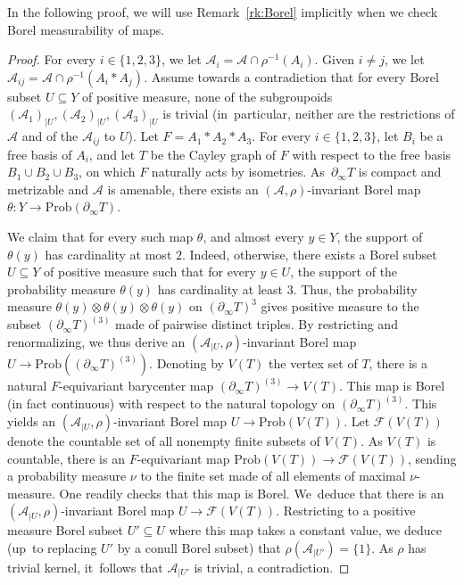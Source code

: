 \documentclass[11pt]{article}
\numberwithin{equation}{section}
\let\mathcal\mathscr
\theoremstyle{plain}
\theoremstyle{definition}
\newcommand{\cala}{\mathcal{A}}
\newcommand{\calf}{\mathcal{F}}
\newcommand{\Prob}{\mathrm{Prob}}
\begin{document}
In the following proof, we will use Remark~\ref{rk:Borel} implicitly when we check Borel measurability of maps.

\begin{proof}
For every $i\in\{1,2,3\}$, we let $\cala_i=\cala\cap\rho^{-1}(A_i)$. Given $i\neq j$, we let $\cala_{ij}=\cala\cap\rho^{-1}(A_i\ast A_j)$. Assume towards a contradiction that for every Borel subset $U\subseteq Y$ of positive measure, none of the subgroupoids $(\cala_1)_{|U},(\cala_2)_{|U},(\cala_3)_{|U}$ is trivial (in~par\-ticular, neither are the restrictions of $\cala$ and of the $\cala_{ij}$ to $U$). Let $F=A_1\ast A_2\ast A_3$. For every $i\in\{1,2,3\}$, let $B_i$ be a free basis of $A_i$, and let $T$ be the Cayley graph of $F$ with respect to the free basis $B_1\cup B_2\cup B_3$, on which $F$ naturally acts by isometries. As~$\partial_\infty T$ is compact and metrizable and $\cala$ is amenable, there exists an $(\cala,\rho)$-invariant Borel map $\theta:Y\to \Prob(\partial_\infty T)$.

We claim that for every such map $\theta$, and almost every $y\in Y$, the support of $\theta(y)$ has cardinality at most $2$. Indeed, otherwise, there exists a Borel subset $U\subseteq Y$ of positive measure such that for every $y\in U$, the support of the probability measure $\theta(y)$ has cardinality at least $3$. Thus, the probability measure $\theta(y)\otimes\theta(y)\otimes\theta(y)$ on $(\partial_\infty T)^3$ gives positive measure to the subset $(\partial_\infty T)^{(3)}$ made of pairwise distinct triples. By restricting and renormalizing, we thus derive an $(\cala_{|U},\rho)$-invariant Borel map $U\to\Prob((\partial_\infty T)^{(3)})$. Denoting by $V(T)$ the vertex set of $T$, there is a natural $F$-equivariant barycenter map $(\partial_\infty T)^{(3)}\to V(T)$. This map is Borel (in fact continuous) with respect to the natural topology on $(\partial_\infty T)^{(3)}$. This yields an $(\cala_{|U},\rho)$-invariant Borel map $U\to\Prob(V(T))$. Let $\calf(V(T))$ denote the countable set of all nonempty finite subsets of $V(T)$. As $V(T)$ is countable, there is an $F$-equivariant map $\Prob(V(T))\to\calf(V(T))$, sending a probability measure $\nu$ to the finite set made of all elements of maximal $\nu$-measure. One readily checks that this map is Borel. We~deduce that there is an $(\cala_{|U},\rho)$-invariant Borel map $U\to\calf(V(T))$. Restricting to a positive measure Borel subset $U'\subseteq U$ where this map takes a constant value, we deduce (up~to replacing $U'$ by a conull Borel subset) that $\rho(\cala_{|U'})=\{1\}$. As $\rho$ has trivial kernel, it~follows that $\cala_{|U'}$ is trivial, a contradiction.


\end{proof}
\end{document}
